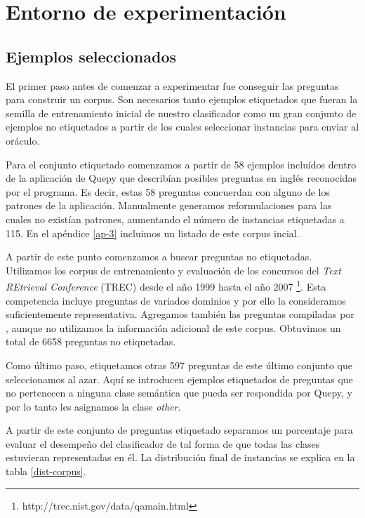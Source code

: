 

\chapter{Entorno de experimentación}

\section{Ejemplos seleccionados}\label{descripcion-corpus}

El primer paso antes de comenzar a experimentar fue conseguir las preguntas para construir un corpus. Son necesarios tanto ejemplos etiquetados que fueran la semilla de entrenamiento inicial de nuestro clasificador como un gran conjunto de ejemplos no etiquetados a partir de los cuales seleccionar instancias para enviar al oráculo.

Para el conjunto etiquetado comenzamos a partir de 58 ejemplos incluídos dentro de la aplicación de Quepy que describían posibles preguntas en inglés reconocidas por el programa. Es decir, estas 58 preguntas concuerdan con alguno de los patrones de la aplicación. Manualmente generamos reformulaciones para las cuales no existían patrones, aumentando el número de instancias etiquetadas a 115. En el apéndice \ref{ap-3} incluimos un listado de este corpus incial.

A partir de este punto comenzamos a buscar preguntas no etiquetadas. Utilizamos los corpus de entrenamiento y evaluación de los concursos del \textit{Text REtrieval Conference} (TREC) desde el año 1999 hasta el año 2007 \footnote{http://trec.nist.gov/data/qamain.html}. Esta competencia incluye preguntas de variados dominios y por ello la consideramos suficientemente representativa. Agregamos también las preguntas compiladas por \citet{corpus-stanford}, aunque no utilizamos la información adicional de este corpus. Obtuvimos un total de 6658 preguntas no etiquetadas.

Como último paso, etiquetamos otras 597 preguntas de este último conjunto que seleccionamos al azar. Aquí se introducen ejemplos etiquetados de preguntas que no pertenecen a ninguna clase semántica que pueda ser respondida por Quepy, y por lo tanto les asignamos la clase \textit{other}.

A partir de este conjunto de preguntas etiquetado separamos un porcentaje para evaluar el desempeño del clasificador de tal forma de que todas las clases estuvieran representadas en él. La distribución final de instancias se explica en la tabla \ref{dist-corpus}.

